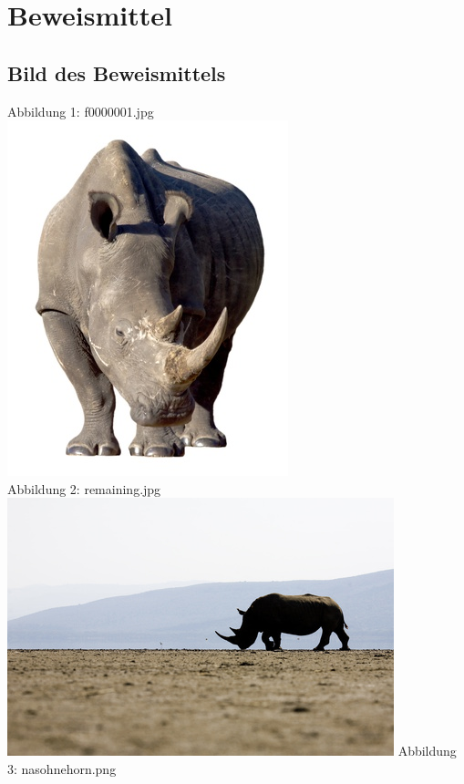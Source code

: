 \chapter{Beweismittel}

\section{Bild des Beweismittels}

Abbildung 1: f0000001.jpg\\
\includegraphics[scale=0.6]{bilder/f0000001.jpg }\\
Abbildung 2: remaining.jpg\\
\includegraphics[scale=0.6]{bilder/remaining.jpg }\newpage
Abbildung 3: nasohnehorn.png\\
